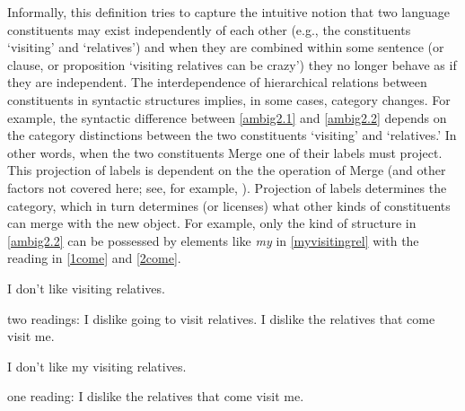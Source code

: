 \documentclass[11pt]{article}
\begin{document}
Informally, this definition tries to capture the intuitive notion that two language constituents may exist independently of each other (e.g., the constituents `visiting' and `relatives') and when they are combined within some sentence (or clause, or proposition `visiting relatives can be crazy') they no longer behave as if they are independent. The interdependence of hierarchical relations between constituents in syntactic structures implies, in some cases, category changes. For example, the syntactic difference between \ref{ambig2.1} and \ref{ambig2.2} depends on the category distinctions between the two constituents `visiting' and `relatives.' In other words, when the two constituents Merge one of their labels must project. This projection of labels is dependent on the the operation of Merge (and other factors not covered here; see, for example, \citep{boeckx08bare}). Projection of labels determines the category, which in turn determines (or licenses) what other kinds of constituents can merge with the new object. For example,
only the kind of structure in \ref{ambig2.2} can be possessed by elements like \textsl{my} in \ref{myvisitingrel} with the reading in \ref{1come} and \ref{2come}.

\begin{exe}
\ex I don't like visiting relatives.
\begin{xlist} 
\ex two readings: 
\ex I dislike going to visit relatives.
\ex I dislike the relatives that come visit me.\label{1come}
\end{xlist}

\ex I don't like my visiting relatives.\label{myvisitingrel}
\begin{xlist}
\ex one reading:
\ex I dislike the relatives that come visit me.\label{2come}
\end{xlist}
\end{exe}







\newpage
%




 
\end{document}
